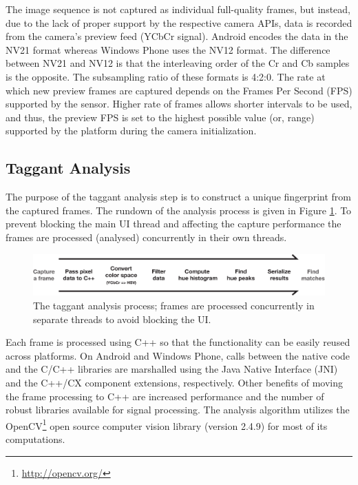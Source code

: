 \documentclass[thesis.tex]{subfiles}
\begin{document}
The image sequence is not captured as individual full-quality frames, but instead, due to the lack of proper support by the respective camera APIs, data is recorded from the camera's preview feed (YCbCr signal). Android encodes the data in the NV21 format whereas Windows Phone uses the NV12 format. The difference between NV21 and NV12 is that the interleaving order of the Cr and Cb samples is the opposite. The subsampling ratio of these formats is 4:2:0. The rate at which new preview frames are captured depends on the Frames Per Second (FPS) supported by the sensor. Higher rate of frames allows shorter intervals to be used, and thus, the preview FPS is set to the highest possible value (or, range) supported by the platform during the camera initialization.

\subsection{Taggant Analysis}
\label{chapter:taggant-analysis}

The purpose of the taggant analysis step is to construct a unique fingerprint from the captured frames. The rundown of the analysis process is given in Figure \ref{figure:taggant-analysis-process}. To prevent blocking the main UI thread and affecting the capture performance the frames are processed (analysed) concurrently in their own threads.

\begin{figure}[h]
\centering \includegraphics[width=\textwidth,height=\textheight,keepaspectratio=true]{images/design_implementation/analysis_process.pdf}
\caption{The taggant analysis process; frames are processed concurrently in separate threads to avoid blocking the UI.\label{figure:taggant-analysis-process}}
\end{figure}

Each frame is processed using C++ so that the functionality can be easily reused across platforms. On Android and Windows Phone, calls between the native code and the C/C++ libraries are marshalled using the Java Native Interface (JNI) and the C++/CX component extensions, respectively. Other benefits of moving the frame processing to C++ are increased performance and the number of robust libraries available for signal processing. The analysis algorithm utilizes the OpenCV\footnote{\url{http://opencv.org/}} open source computer vision library (version 2.4.9) for most of its computations.
\end{document}
